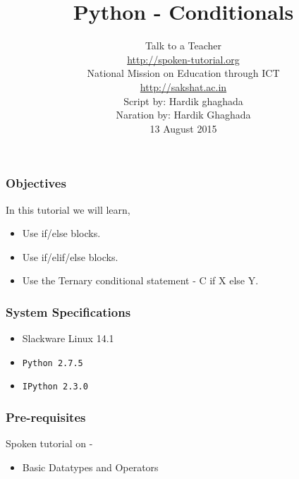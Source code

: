\documentclass[17pt,compress]{beamer}
\author[FOSSEE]{}
\institute[IIT Bombay]{}
\date[]{}
\begin{document}
\sffamily \bfseries
\title
[Conditionals]
{Python - Conditionals}
\author
[FOSSEE, IIT - Bombay]
{\small Talk to a Teacher\\{\color{blue}\url{http://spoken-tutorial.org}}\\National Mission on Education
 through ICT\\{\color{blue}\url{http://sakshat.ac.in}} \\[0.5cm]{\tiny Script by: Hardik ghaghada \\ Naration by: Hardik Ghaghada \\ 13 August 2015}}

\begin{frame}
   \titlepage
\end{frame}
\begin{frame}
\frametitle{Objectives}
\label{sec-2}

  In this tutorial we will learn, \pause


\begin{itemize}
\item Use if/else blocks.\pause
\item Use if/elif/else blocks.\pause
\item Use the Ternary conditional statement - C if X else Y.
\end{itemize}
  
\end{frame}
\begin{frame}
\frametitle{System Specifications}\pause
\begin{itemize}
\item Slackware Linux 14.1\pause
\item \texttt{Python 2.7.5} \pause
\item \texttt{IPython 2.3.0}
\end{itemize}
\end{frame}
\begin{frame}
\frametitle{Pre-requisites}
\label{sec-3}

Spoken tutorial on -

\begin{itemize}
\item Basic Datatypes and Operators
\end{itemize}
\end{frame}
\end{document}
